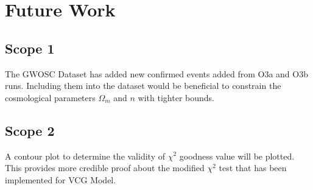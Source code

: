 




\chapter{Future Work}
\vspace*{-0.6cm}


\section{Scope 1}
The GWOSC Dataset has added new confirmed events added from O3a and O3b runs. Including them into the dataset would be beneficial to constrain the cosmological parameters $\Omega_{m}$ and $n$ with tighter bounds.



\section{Scope 2}
A contour plot to determine the validity of $\chi^{2}$ goodness value will be plotted. This provides more credible proof about the modified $\chi^{2}$ test that has been implemented for VCG Model. 









